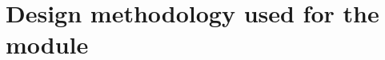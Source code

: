 \documentclass[conference]{IEEEtran}
\begin{document}
\section{Design methodology used for the module}
\end{document}
